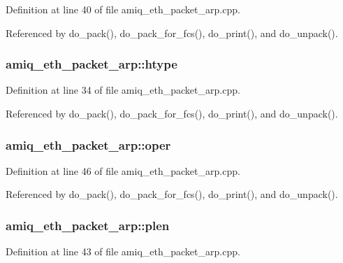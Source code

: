 Definition at line 40 of file amiq\_\-eth\_\-packet\_\-arp.cpp.

Referenced by do\_\-pack(), do\_\-pack\_\-for\_\-fcs(), do\_\-print(), and do\_\-unpack().\hypertarget{classamiq__eth__packet__arp_ad68808d1acee5cca1aa1018d5178fd70}{
\subsubsection[{htype}]{ {\bf amiq\_\-eth\_\-packet\_\-arp::htype}}}
\label{classamiq__eth__packet__arp_ad68808d1acee5cca1aa1018d5178fd70}


Definition at line 34 of file amiq\_\-eth\_\-packet\_\-arp.cpp.

Referenced by do\_\-pack(), do\_\-pack\_\-for\_\-fcs(), do\_\-print(), and do\_\-unpack().\hypertarget{classamiq__eth__packet__arp_a3e338c8338dc370a062e3548b1d5eb57}{
\subsubsection[{oper}]{ {\bf amiq\_\-eth\_\-packet\_\-arp::oper}}}
\label{classamiq__eth__packet__arp_a3e338c8338dc370a062e3548b1d5eb57}


Definition at line 46 of file amiq\_\-eth\_\-packet\_\-arp.cpp.

Referenced by do\_\-pack(), do\_\-pack\_\-for\_\-fcs(), do\_\-print(), and do\_\-unpack().\hypertarget{classamiq__eth__packet__arp_a64075c60ab6794a6ebfe0f319a7a7ae1}{
\subsubsection[{plen}]{ {\bf amiq\_\-eth\_\-packet\_\-arp::plen}}}
\label{classamiq__eth__packet__arp_a64075c60ab6794a6ebfe0f319a7a7ae1}


Definition at line 43 of file amiq\_\-eth\_\-packet\_\-arp.cpp.

